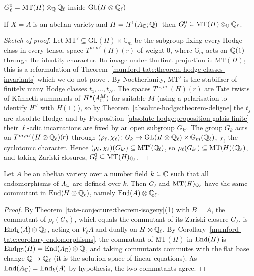 \begin{conjecture}\label{tate-conjecture:conjecture-mumford-tate}
$G_\ell^0 = \mathrm{MT}(H) \otimes_{\mathbb{Q}}\mathbb{Q}_\ell$ inside $\mathrm{GL}(H \otimes \mathbb{Q}_\ell)$.
\end{conjecture}

\begin{theorem}[Deligne]\label{tate-conjecture:theorem-deligne-inclusion}
If $X = A$ is an abelian variety and $H = H^1(A_{\mathbb{C}}; \mathbb{Q})$, then $G_\ell^0 \subseteq \mathrm{MT}(H) \otimes_{\mathbb{Q}}\mathbb{Q}_\ell$.
\end{theorem}

\begin{proof}[Sketch of proof]
Let $\mathrm{MT}' \subseteq \mathrm{GL}(H) \times \mathbb{G}_m$ be the subgroup fixing every Hodge class in every tensor space $T^{m,m'}(H)(r)$ of weight $0$, where $\mathbb{G}_m$ acts on $\mathbb{Q}(1)$ through the identity
character. Its image under the first projection is $\mathrm{MT}(H)$; this is a reformulation of Theorem~\ref{mumford-tate:theorem-hodge-classes-invariants} which we do not prove \cite{deligne-abelian}. By
Noetherianity, $\mathrm{MT}'$ is the stabiliser of finitely many Hodge classes $t_1, \ldots, t_N$. The spaces $T^{m,m'}(H)(r)$ are Tate twists of Künneth summands of $H^\bullet(A^M_{\mathbb{C}})$ for suitable $M$ (using a
polarisation to identify $H^\vee$ with $H(1)$), so by Theorem~\ref{absolute-hodge:theorem-deligne} the $t_j$ are absolute Hodge, and by Proposition~\ref{absolute-hodge:proposition-galois-finite} their $\ell$-adic
incarnations are fixed by an open subgroup $G_{k'}$. The group $G_k$ acts on $T^{m,m'}(H \otimes \mathbb{Q}_\ell)(r)$ through $(\rho_\ell, \chi_\ell) \colon G_k \to \mathrm{GL}(H \otimes \mathbb{Q}_\ell) \times \mathbb{G}_m(\mathbb{Q}_\ell)$,
$\chi_\ell$ the cyclotomic character. Hence $(\rho_\ell, \chi_\ell)(G_{k'}) \subseteq \mathrm{MT}'(\mathbb{Q}_\ell)$, so $\rho_\ell(G_{k'}) \subseteq \mathrm{MT}(H)(\mathbb{Q}_\ell)$, and taking Zariski closures,
$G_\ell^0 \subseteq \mathrm{MT}(H)_{\mathbb{Q}_\ell}$.
\end{proof}

\begin{proposition}\label{tate-conjecture:proposition-commutants}
Let $A$ be an abelian variety over a number field $k \subseteq \mathbb{C}$ such that all endomorphisms of $A_{\mathbb{C}}$ are defined over $k$. Then $G_\ell$ and $\mathrm{MT}(H)_{\mathbb{Q}_\ell}$ have the same commutant in
$\operatorname{End}(H \otimes \mathbb{Q}_\ell)$, namely $\operatorname{End}(A) \otimes \mathbb{Q}_\ell$.
\end{proposition}

\begin{proof}
By Theorem~\ref{tate-conjecture:theorem-isogeny}(1) with $B = A$, the commutant of $\rho_\ell(G_k)$, which equals the commutant of its Zariski closure $G_\ell$, is $\operatorname{End}_k(A) \otimes \mathbb{Q}_\ell$, acting on
$V_\ell A$ and dually on $H \otimes \mathbb{Q}_\ell$. By Corollary~\ref{mumford-tate:corollary-endomorphisms}, the commutant of $\mathrm{MT}(H)$ in $\operatorname{End}(H)$ is $\operatorname{End}_{\mathrm{HS}}(H) = \operatorname{End}(A_{\mathbb{C}}) \otimes \mathbb{Q}$, and taking
commutants commutes with the flat base change $\mathbb{Q} \to \mathbb{Q}_\ell$ (it is the solution space of linear equations). As $\operatorname{End}(A_{\mathbb{C}}) = \operatorname{End}_k(A)$ by hypothesis, the two commutants agree.
\end{proof}

